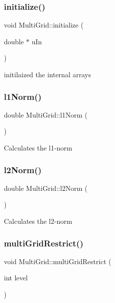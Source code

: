 \subsubsection{\texorpdfstring{initialize()}{initialize()}}
{\footnotesize\ttfamily void Multi\+Grid\+::initialize (\begin{DoxyParamCaption}\item[{double $\ast$}]{u\+In }\end{DoxyParamCaption})}

initilaized the internal arrays \mbox{\label{classMultiGrid_a147206a8dd140649ef797a241d4ee258}} 
\subsubsection{\texorpdfstring{l1\+Norm()}{l1Norm()}}
{\footnotesize\ttfamily double Multi\+Grid\+::l1\+Norm (\begin{DoxyParamCaption}{ }\end{DoxyParamCaption})}

Calculates the l1-\/norm \mbox{\label{classMultiGrid_a23ea3051d3d9a3fb43f2725b6e9f9efc}} 
\subsubsection{\texorpdfstring{l2\+Norm()}{l2Norm()}}
{\footnotesize\ttfamily double Multi\+Grid\+::l2\+Norm (\begin{DoxyParamCaption}{ }\end{DoxyParamCaption})}

Calculates the l2-\/norm \mbox{\label{classMultiGrid_a4ae7a3a7c3898e86465d635f379f5828}} 
\subsubsection{\texorpdfstring{multi\+Grid\+Restrict()}{multiGridRestrict()}}
{\footnotesize\ttfamily void Multi\+Grid\+::multi\+Grid\+Restrict (\begin{DoxyParamCaption}\item[{int}]{level }\end{DoxyParamCaption})}

